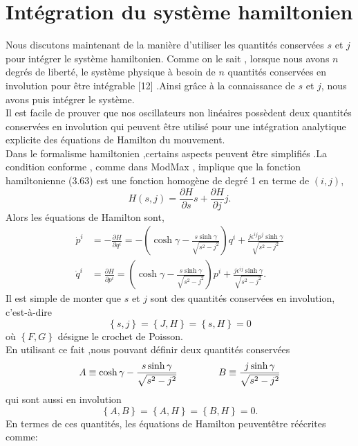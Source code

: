 \documentclass[12pt,a4paper, openany]{report}
\begin{document}
	\section{Intégration du système hamiltonien}
	\par Nous discutons maintenant de la manière d'utiliser les quantités conservées $s$ et $j$ pour intégrer le système hamiltonien. Comme on le sait , lorsque nous avons $n$ degrés de liberté, le système physique à besoin de $n$ quantités conservées en involution pour \^{e}tre intégrable [12] .Ainsi gr\^{a}ce à la connaissance de $s$ et $j$, nous avons puis intégrer le système.\\ Il est facile de prouver que nos oscillateurs non linéaires possèdent deux quantités conservées en involution qui peuvent \^{e}tre utilisé pour une intégration analytique explicite des équations de Hamilton du mouvement.\\ Dans le formalisme hamiltonien ,certains aspects peuvent \^{e}tre simplifiés .La condition conforme , comme dans ModMax , implique que la fonction hamiltonienne (3.63) est une fonction homogène de degré 1 en terme de $(i,j) $,
	\begin{equation}
		H(s,j)=\frac{\partial H}{\partial s}s+\frac{\partial H}{\partial j}j .
	\end{equation}  
	Alors les équations de Hamilton sont,
	\begin{equation}
		\left.\begin{aligned}
			\dot{p}^{i}&=-\frac{\partial H}{\partial q^i}=-\left(\cosh{\gamma}-\frac{s\sinh{\gamma}}{\sqrt{s^2-j^2}}\right)q^i+\frac{ j\epsilon^{ij}p^j\sinh{\gamma}}{\sqrt{s^2-j^2}}\\	
			\dot{q}^{i}&=\frac{\partial H}{\partial p^i}=\left(\cosh{\gamma}-\frac{s\sinh{\gamma}}{\sqrt{s^2-j^2}}\right)p^i+\frac{	j\epsilon^{ij}\sinh{\gamma}}{\sqrt{s^2-j^2}}.
		\end{aligned}\right.	
	\end{equation}
	Il est simple de monter que $s$ et $j$ sont des quantités conservées en involution, c'est-à-dire 
	\begin{equation}
		\left\{s,j\right\}=\left\{J,H\right\}=\left\{s,H\right\}=0
	\end{equation}
	où $\left\{F,G\right\}$ désigne le crochet de Poisson.\\ En utilisant ce fait ,nous pouvant définir deux quantités conservées 
	\begin{equation}
		A\equiv\cosh{\gamma}-\frac{s\sinh{\gamma}}{\sqrt{s^2-j^2}} \hspace{1.5cm} B\equiv\frac{j\sinh{\gamma}}{\sqrt{s^2-j^2}}
	\end{equation}
	qui sont aussi en involution 
	\begin{equation}
		\left\{A,B\right\}=\left\{A,H\right\}=\left\{B,H\right\}=0 .	
	\end{equation}
	En termes de ces quantités, les équations de Hamilton peuvent\^{e}tre réécrites comme:
	
\end{document}
